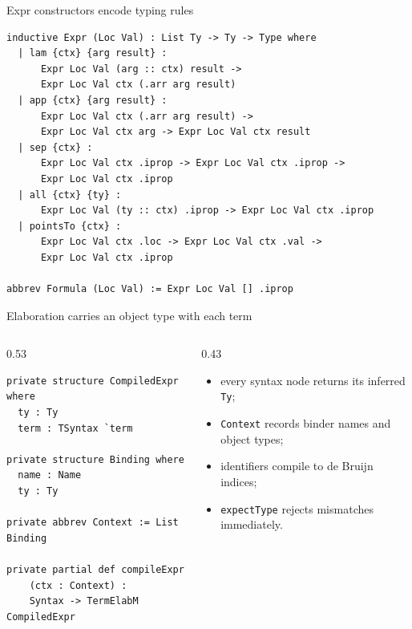 \documentclass[10pt,aspectratio=169]{beamer}
\begin{document}
\begin{frame}[fragile]{Expr constructors encode typing rules}
\begin{lstlisting}[style=leancode,basicstyle=\ttfamily\tiny]
inductive Expr (Loc Val) : List Ty -> Ty -> Type where
  | lam {ctx} {arg result} :
      Expr Loc Val (arg :: ctx) result ->
      Expr Loc Val ctx (.arr arg result)
  | app {ctx} {arg result} :
      Expr Loc Val ctx (.arr arg result) ->
      Expr Loc Val ctx arg -> Expr Loc Val ctx result
  | sep {ctx} :
      Expr Loc Val ctx .iprop -> Expr Loc Val ctx .iprop ->
      Expr Loc Val ctx .iprop
  | all {ctx} {ty} :
      Expr Loc Val (ty :: ctx) .iprop -> Expr Loc Val ctx .iprop
  | pointsTo {ctx} :
      Expr Loc Val ctx .loc -> Expr Loc Val ctx .val ->
      Expr Loc Val ctx .iprop

abbrev Formula (Loc Val) := Expr Loc Val [] .iprop
\end{lstlisting}

  \vfill
\end{frame}

\begin{frame}[fragile]{Elaboration carries an object type with each term}
  \begin{columns}[T,onlytextwidth]
    \begin{column}{0.53\textwidth}
\begin{lstlisting}[style=leancode,basicstyle=\ttfamily\tiny]
private structure CompiledExpr where
  ty : Ty
  term : TSyntax `term

private structure Binding where
  name : Name
  ty : Ty

private abbrev Context := List Binding

private partial def compileExpr
    (ctx : Context) :
    Syntax -> TermElabM CompiledExpr
\end{lstlisting}
    \end{column}
    \begin{column}{0.43\textwidth}
      \begin{itemize}
        \item every syntax node returns its inferred \texttt{Ty};
        \item \texttt{Context} records binder names and object types;
        \item identifiers compile to de Bruijn indices;
        \item \texttt{expectType} rejects mismatches immediately.
      \end{itemize}
    \end{column}
  \end{columns}
\end{frame}
\end{document}
